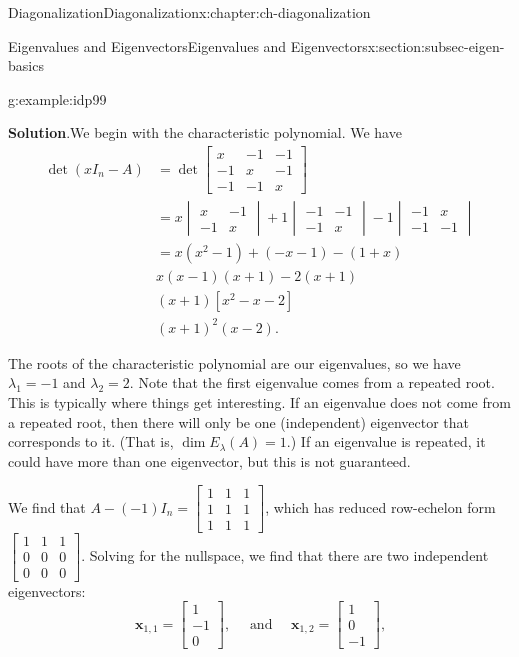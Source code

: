 \documentclass[oneside,10pt,]{book}
\newcommand{\blocktitlefont}{\relax}
\numberwithin{equation}{section}
\newcommand{\bbm}{\begin{bmatrix}}
\newcommand{\ebm}{\end{bmatrix}}
\newcommand{\xx}{\mathbf{x}}
\newcommand{\amp}{&}
\begin{document}
\begin{chapterptx}{Diagonalization}{}{Diagonalization}{}{}{x:chapter:ch-diagonalization}
\begin{sectionptx}{Eigenvalues and Eigenvectors}{}{Eigenvalues and Eigenvectors}{}{}{x:section:subsec-eigen-basics}
\begin{example}{}{g:example:idp99}
\par\smallskip%
\noindent\textbf{\blocktitlefont Solution}.\hypertarget{g:solution:idp100}{}\quad{}We begin with the characteristic polynomial. We have%
\begin{align*}
\det(xI_n - A) \amp =\det\bbm x \amp -1\amp -1\\-1\amp x \amp -1\\-1\amp -1\amp x\ebm\\
\amp = x \begin{vmatrix}x \amp -1\\-1\amp x\end{vmatrix}
+1\begin{vmatrix}-1\amp -1\\-1\amp x\end{vmatrix}
-1\begin{vmatrix}-1\amp x\\-1\amp -1\end{vmatrix}\\
\amp = x(x^2-1)+(-x-1)-(1+x)\\
\amp x(x-1)(x+1)-2(x+1)\\
\amp (x+1)[x^2-x-2]\\
\amp (x+1)^2(x-2)\text{.}
\end{align*}
%
\par
The roots of the characteristic polynomial are our eigenvalues, so we have \(\lambda_1=-1\) and \(\lambda_2=2\). Note that the first eigenvalue comes from a repeated root. This is typically where things get interesting. If an eigenvalue does not come from a repeated root, then there will only be one (independent) eigenvector that corresponds to it. (That is, \(\dim E_\lambda(A)=1\).) If an eigenvalue is repeated, it could have more than one eigenvector, but this is not guaranteed.%
\par
We find that \(A-(-1)I_n = \bbm 1\amp 1\amp 1\\1\amp 1\amp 1\\1\amp 1\amp 1\ebm\), which has reduced row-echelon form \(\bbm 1\amp 1\amp 1\\0\amp 0\amp 0\\0\amp 0\amp 0\ebm\). Solving for the nullspace, we find that there are two independent eigenvectors:%
\begin{equation*}
\xx_{1,1}=\bbm 1\\-1\\0\ebm, \quad \text{ and } \quad \xx_{1,2}=\bbm 1\\0\\-1\ebm\text{,}
\end{equation*}

\end{example}
\end{sectionptx}
\end{chapterptx}
\end{document}
